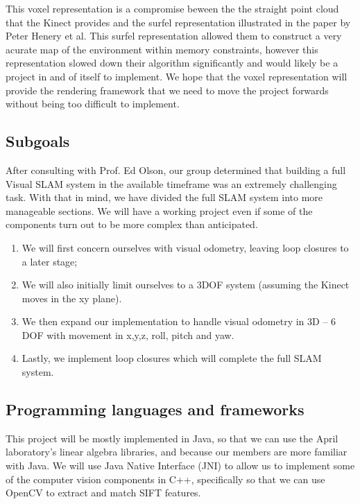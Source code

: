 \documentclass[12pt]{article}
\begin{document}
This voxel representation is a compromise beween the the straight point cloud that the Kinect provides and the surfel representation illustrated in the paper by Peter Henery et al. This surfel representation allowed them to construct a very acurate map of the environment within memory constraints, however this representation slowed down their algorithm significantly and would likely be a project in and of itself to implement.  We hope that the voxel representation will provide the rendering framework that we need to move the project forwards without being too difficult to implement.

\subsection{Subgoals}

After consulting with Prof. Ed Olson, our group determined that building a full Visual SLAM system in the available timeframe was an extremely challenging task.  With that in mind, we have divided the full SLAM system into more manageable sections.  We will have a working project even if some of the components turn out to be more complex than anticipated.

\begin{enumerate}
\item We will first concern ourselves with visual odometry, leaving loop closures to a later stage;
\item We will also initially limit ourselves to a 3DOF system (assuming the Kinect moves in the xy plane).
\item We then expand our implementation to handle visual odometry in 3D -- 6 DOF with movement in x,y,z, roll, pitch and yaw.
\item Lastly, we implement loop closures which will complete the full SLAM system. 
\end{enumerate}

\subsection{Programming languages and frameworks}

This project will be mostly implemented in Java, so that we can use the April laboratory's linear algebra libraries, and because our members are more familiar with Java.  We will use Java Native Interface (JNI) to allow us to implement some of the computer vision components in C++, specifically so that we can use OpenCV to extract and match SIFT features.
\end{document}
